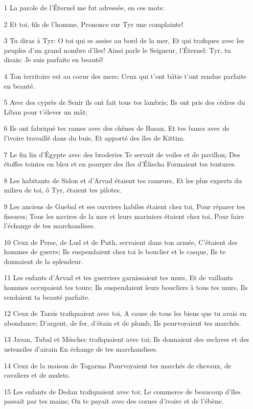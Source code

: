 \par 1 La parole de l'Éternel me fut adressée, en ces mots:
\par 2 Et toi, fils de l'homme, Prononce sur Tyr une complainte!
\par 3 Tu diras à Tyr: O toi qui es assise au bord de la mer, Et qui trafiques avec les peuples d'un grand nombre d'îles! Ainsi parle le Seigneur, l'Éternel: Tyr, tu disais: Je suis parfaite en beauté!
\par 4 Ton territoire est au coeur des mers; Ceux qui t'ont bâtie t'ont rendue parfaite en beauté.
\par 5 Avec des cyprès de Senir ils ont fait tous tes lambris; Ils ont pris des cèdres du Liban pour t'élever un mât;
\par 6 Ils ont fabriqué tes rames avec des chênes de Basan, Et tes bancs avec de l'ivoire travaillé dans du buis, Et apporté des îles de Kittim.
\par 7 Le fin lin d'Égypte avec des broderies Te servait de voiles et de pavillon; Des étoffes teintes en bleu et en pourpre des îles d'Élischa Formaient tes tentures.
\par 8 Les habitants de Sidon et d'Arvad étaient tes rameurs, Et les plus experts du milieu de toi, ô Tyr, étaient tes pilotes.
\par 9 Les anciens de Guebal et ses ouvriers habiles étaient chez toi, Pour réparer tes fissures; Tous les navires de la mer et leurs mariniers étaient chez toi, Pour faire l'échange de tes marchandises.
\par 10 Ceux de Perse, de Lud et de Puth, servaient dans ton armée, C'étaient des hommes de guerre; Ils suspendaient chez toi le bouclier et le casque, Ils te donnaient de la splendeur.
\par 11 Les enfants d'Arvad et tes guerriers garnissaient tes murs, Et de vaillants hommes occupaient tes tours; Ils suspendaient leurs boucliers à tous tes murs, Ils rendaient ta beauté parfaite.
\par 12 Ceux de Tarsis trafiquaient avec toi, A cause de tous les biens que tu avais en abondance; D'argent, de fer, d'étain et de plomb, Ils pourvoyaient tes marchés.
\par 13 Javan, Tubal et Méschec trafiquaient avec toi; Ils donnaient des esclaves et des ustensiles d'airain En échange de tes marchandises.
\par 14 Ceux de la maison de Togarma Pourvoyaient tes marchés de chevaux, de cavaliers et de mulets.
\par 15 Les enfants de Dedan trafiquaient avec toi; Le commerce de beaucoup d'îles passait par tes mains; On te payait avec des cornes d'ivoire et de l'ébène.
